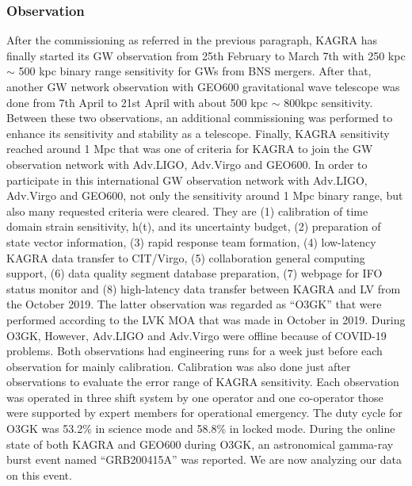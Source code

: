 \vspace{10pt}
\subsubsection*{\bf Observation}
\vspace{3pt}

\vspace{3pt}

\vspace{3pt}

After the commissioning as referred in the previous paragraph, KAGRA has finally started its GW observation from 25th February to March 7th with 250 kpc $\sim$ 500 kpc binary range sensitivity for GWs from BNS mergers. After that, another GW network observation with GEO600 gravitational wave telescope was done from 7th April to 21st April with about 500 kpc $\sim$ 800kpc sensitivity. Between these two observations, an additional commissioning was performed to enhance its sensitivity and stability as a telescope. Finally, KAGRA sensitivity reached around 1 Mpc that was one of criteria for KAGRA to join the GW observation network with Adv.LIGO, Adv.Virgo and GEO600. In order to participate in this international GW observation network with Adv.LIGO, Adv.Virgo and GEO600, not only the sensitivity around 1 Mpc binary range, but also many requested criteria were cleared. They are (1) calibration of time domain strain sensitivity, h(t), and its uncertainty budget, (2) preparation of state vector information, (3) rapid response team formation, (4) low-latency KAGRA data transfer to CIT/Virgo, (5) collaboration general computing support, (6) data quality segment database preparation, (7) webpage for IFO status monitor and (8) high-latency data transfer between KAGRA and LV from the October 2019. The latter observation was regarded as ``O3GK'' that were performed according to the LVK MOA that was made in October in 2019. During O3GK, However, Adv.LIGO and Adv.Virgo were offline because of COVID-19 problems. Both observations had engineering runs for a week just before each observation for mainly calibration. Calibration was also done just after observations to evaluate the error range of KAGRA sensitivity. Each observation was operated in three shift system by one operator and one co-operator those were supported by expert members for operational emergency. The duty cycle for O3GK was 53.2\% in science mode and 58.8\% in locked mode. During the online state of both KAGRA and GEO600 during O3GK, an astronomical gamma-ray burst event named ``GRB200415A'' was reported. We are now analyzing our data on this event. 